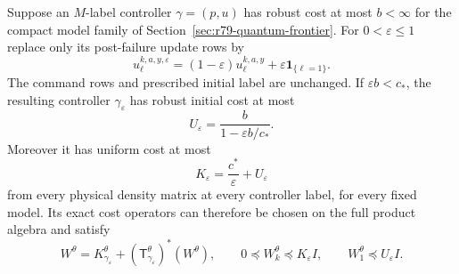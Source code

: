 \begin{theorem}
\label{thm:r79-label-restart}
Suppose an $M$-label controller $\gamma=(p,u)$ has robust cost at
most $b<\infty$ for the compact model family of
Section~\ref{sec:r79-quantum-frontier}.  For $0<\varepsilon\le1$
replace only its post-failure update rows by
\begin{equation}\label{eq:r79-label-restart}
 u^{k,a,y,\varepsilon}_\ell
       =(1-\varepsilon)u^{k,a,y}_\ell
                        +\varepsilon\mathbf1_{\{\ell=1\}}.
\end{equation}
The command rows and prescribed initial label are unchanged.  If
$\varepsilon b<c_*$, the resulting controller $\gamma_\varepsilon$
has robust initial cost at most
\begin{equation}\label{eq:r79-restart-initial-bound}
 U_\varepsilon=\frac{b}{1-\varepsilon b/c_*}.
\end{equation}
Moreover it has uniform cost at most
\begin{equation}\label{eq:r79-restart-global-bound}
 K_\varepsilon=\frac{c^*}{\varepsilon}+U_\varepsilon
\end{equation}
from every physical density matrix at every controller label, for
every fixed model.  Its exact cost operators can therefore be
chosen on the full product algebra and satisfy
\begin{equation}\label{eq:r79-global-witness}
 W^\theta=K^\theta_{\gamma_\varepsilon}
                +(\mathsf T^\theta_{\gamma_\varepsilon})^*(W^\theta),
 \qquad 0\preccurlyeq W^\theta_k\preccurlyeq K_\varepsilon I,
 \qquad W^\theta_1\preccurlyeq U_\varepsilon I.
\end{equation}
\end{theorem}
